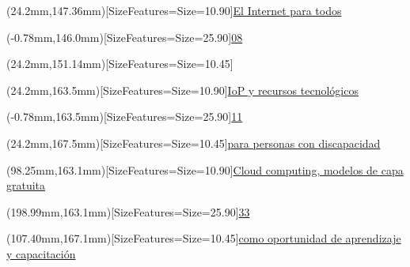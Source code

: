 \documentclass[12pt,spanish,Letterpaper,openany]{book}
\begin{document}
\begin{textblock*}{\textwidth}(24.2mm,147.36mm)[SizeFeatures={Size=10.90}]{\color{titlePart1Contenido}\protect\hyperlink{article04}{El Internet para todos}}\end{textblock*}

\begin{textblock*}{\textwidth}(-0.78mm,146.0mm)[SizeFeatures={Size=25.90}]{\color{white}\protect\hyperlink{article04}{08}}\end{textblock*}

\begin{textblock*}{\textwidth}(24.2mm,151.14mm)[SizeFeatures={Size=10.45}]{\color{titlePart2Contenido}\protect\hyperlink{article04}{}}\end{textblock*}

\begin{textblock*}{\textwidth}(24.2mm,163.5mm)[SizeFeatures={Size=10.90}]{\color{titlePart1Contenido}\protect\hyperlink{article05}{IoP y recursos tecnológicos}}\end{textblock*}

\begin{textblock*}{\textwidth}(-0.78mm,163.5mm)[SizeFeatures={Size=25.90}]{\color{white}\protect\hyperlink{article05}{11}}\end{textblock*}

\begin{textblock*}{\textwidth}(24.2mm,167.5mm)[SizeFeatures={Size=10.45}]{\color{titlePart2Contenido}\protect\hyperlink{article05}{para personas con discapacidad}}\end{textblock*}

\begin{textblock*}{\textwidth}(98.25mm,163.1mm)[SizeFeatures={Size=10.90}]{\color{titlePart1Contenido}\protect\hyperlink{article10}{Cloud computing, modelos de capa gratuita}}\end{textblock*}

\begin{textblock*}{\textwidth}(198.99mm,163.1mm)[SizeFeatures={Size=25.90}]{\color{white}\protect\hyperlink{article10}{33}}\end{textblock*}

\begin{textblock*}{\textwidth}(107.40mm,167.1mm)[SizeFeatures={Size=10.45}]{\color{titlePart2Contenido}\protect\hyperlink{article10}{como oportunidad de aprendizaje y capacitación}}\end{textblock*}
\end{document}
